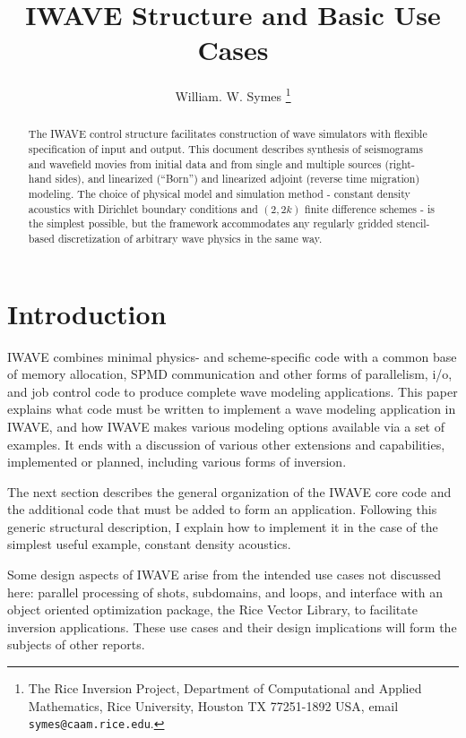 \title{IWAVE Structure and Basic Use Cases}
\author{William. W. Symes \thanks{The Rice Inversion Project,
Department of Computational and Applied Mathematics, Rice University,
Houston TX 77251-1892 USA, email {\tt symes@caam.rice.edu}.}}

\maketitle
\parskip 12pt


\begin{abstract}
  The IWAVE control structure facilitates construction of wave
  simulators with flexible specification of input and output. This
  document describes synthesis of seismograms and wavefield movies
  from initial data and from single and multiple sources (right-hand
  sides), and linearized (``Born'') and linearized adjoint
  (reverse time migration) modeling. The choice of physical model and
  simulation method - constant density acoustics with Dirichlet
  boundary conditions and $(2,2k)$ finite difference schemes - is the
  simplest possible, but the framework accommodates any regularly
  gridded stencil-based discretization of arbitrary wave physics in the same way.
\end{abstract}


\section{Introduction}
IWAVE combines minimal physics- and scheme-specific code with
a common base of memory allocation, SPMD communication and other forms
of parallelism, i/o, and
job control code to produce complete wave modeling applications. This
paper explains what code must be written to implement a wave modeling
application in IWAVE, and how IWAVE makes various modeling options
available via a set of examples. It ends with a discussion of various
other extensions and capabilities, implemented or planned, including
various forms of inversion.

The next section describes the general organization of the IWAVE core
code and the additional code that must be added to form an
application. Following this generic structural description, I explain
how to implement it in the case of the simplest useful example,
constant density acoustics.

Some design aspects of IWAVE arise from the intended use cases not
discussed here: parallel processing of shots, subdomains, and loops,
and interface with an object oriented optimization package, the Rice
Vector Library, to facilitate inversion applications. These use cases
and their design implications will form the subjects of other reports.

